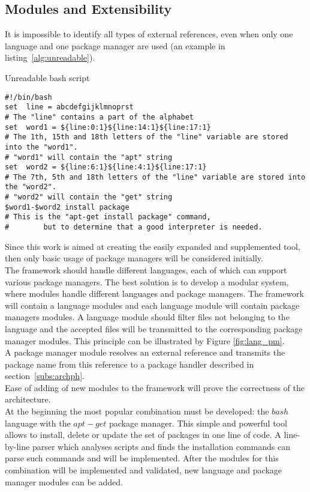 \subsection{Modules and Extensibility}
It is impossible to identify all types of external references, even when only one language and one package manager are used (an example in listing~\ref{alg:unreadable}).
\begin{Listing} 
	\caption{Unreadable bash script}
	\label{alg:unreadable}
\begin{lstlisting}
#!/bin/bash
set  line = abcdefgijklmnoprst
# The "line" contains a part of the alphabet
set  word1 = ${line:0:1}${line:14:1}${line:17:1} 
# The 1th, 15th and 18th letters of the "line" variable are stored into the "word1".
# "word1" will contain the "apt" string 
set  word2 = ${line:6:1}${line:4:1}${line:17:1}
# The 7th, 5th and 18th letters of the "line" variable are stored into the "word2".
# "word2" will contain the "get" string 
$word1-$word2 install package
# This is the "apt-get install package" command,
#		 but to determine that a good interpreter is needed.
\end{lstlisting}
\end{Listing}
Since this work is aimed at creating the easily expanded and supplemented tool, then only basic usage of package managers will be considered initially.\\
The framework should handle different languages, each of which can support various package managers.
The best solution is to develop a modular system, where modules handle different languages and package managers.
The framework will contain a  language modules and each language module will contain package managers modules.
A language module should filter files not belonging to the language and the accepted files will be transmitted to the corresponding package manager modules.
This principle can be illustrated by Figure \ref{fig:lang_pm}.\\
A package manager module resolves an external reference and transmits the package name from this reference to a package handler described in section~\ref{subs:archph}.\\
Ease of adding of new modules to the framework will prove the correctness of the architecture.\\
At the beginning the most popular combination must be developed: the $bash$ language with the $apt-get$ package manager.
This simple and powerful tool allows to install, delete or update the set of packages in one line of code.
A line-by-line parser which analyses scripts and finds the installation commands can parse such commands and will be implemented.
After the modules for this combination will be implemented and validated, new language and package manager modules can be added.


